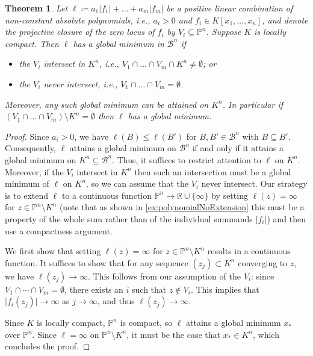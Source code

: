 \documentclass[10pt]{article}
\newtheorem{theorem}{Theorem}[]
\theoremstyle{definition}
\newcommand{\RR}{\mathbb{R}}
\newcommand{\PP}{\mathbb{P}}
\begin{document}
\begin{theorem}
  \label{thm:globalMinimumLocallyCompact}
  Let $\ell \coloneqq a_1|f_1| + \dots + a_m|f_m|$ be a positive linear combination of non-constant absolute polynomials, i.e., $a_i > 0$ and $f_i\in K[x_1,\dots,x_n]$, and denote the projective closure of the zero locus of $f_i$ by $V_i \subseteq \mathbb{P}^n$.  Suppose $K$ is locally compact.  Then $\ell$ has a global minimum in $\mathcal B^n$ if
  \begin{itemize}
    \item the $V_i$ intersect in $K^n$, i.e., $V_1 \cap \dots \cap V_m \cap K^n \neq \emptyset$; or
    \item the $V_i$ never intersect, i.e., $V_1 \cap \dots \cap V_m = \emptyset$.
  \end{itemize}
  Moreover, any such global minimum can be attained on $K^n$.
    In particular if $(V_1 \cap \dots \cap V_m) \setminus K^n = \emptyset$ then $\ell$ has a global minimum.
\end{theorem}
\begin{proof}
  Since $a_i>0$, we have $\ell(B)\leq \ell(B')$ for $B,B'\in\mathcal B^n$ with $B\subseteq B'$.  Consequently, $\ell$ attains a global minimum on $\mathcal B^n$ if and only if it attains a global minimum on $K^n\subseteq \mathcal B^n$.  Thus, it suffices to restrict attention to $\ell$ on $K^n$. Moreover, if the $V_i$ intersect in $K^n$ then such an intersection must be a global minimum of $\ell$ on $K^n$, so we can assume that the $V_i$ never intersect.
  Our strategy is to extend $\ell$ to a continuous function $\PP^n \to \RR\cup\{\infty\}$ by setting $\ell(z) = \infty$ for $z\in\PP^n\setminus K^n$ (note that as shown in \cref{ex:polynomialNoExtension} this must be a property of the whole sum rather than of the individual summands $\lvert f_i \rvert$) and then use a compactness argument.

  We first show that setting $\ell(z) = \infty$ for $z\in\PP^n\setminus K^n$ results in a continuous function. It suffices to show that for any sequence $(z_j) \subset K^n$ converging to $z$, we have $\ell(z_j) \to \infty$. This follows from our assumption of the $V_i$: since $V_1 \cap \dotsb \cap V_m = \emptyset$, there exists an $i$ such that $z \notin V_i$. This implies that $\lvert f_i(z_j) \rvert \to \infty$ as $j \to \infty$, and thus $\ell(z_j) \to \infty$.

  Since $K$ is locally compact, $\PP^n$ is compact, so $\ell$ attains a global minimum $x_*$ over $\PP^n$. Since $\ell = \infty$ on $\PP^n \setminus K^n$, it must be the case that $x_* \in K^n$, which concludes the proof. \qedhere
\end{proof}
\end{document}

